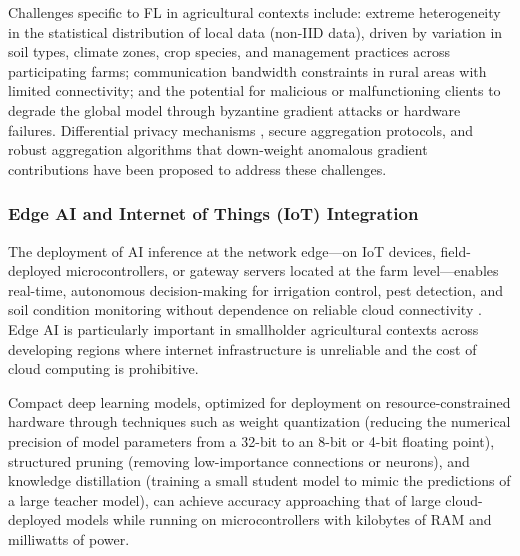 \documentclass[land,review,accept,pdftex,oneauthor]{Definitions/mdpi}
\begin{document}
Challenges specific to FL in agricultural contexts include: extreme heterogeneity in the statistical distribution of local data (non-IID data), driven by variation in soil types, climate zones, crop species, and management practices across participating farms; communication bandwidth constraints in rural areas with limited connectivity; and the potential for malicious or malfunctioning clients to degrade the global model through byzantine gradient attacks or hardware failures. Differential privacy mechanisms \citep{dwork2014algorithmic}, secure aggregation protocols, and robust aggregation algorithms that down-weight anomalous gradient contributions have been proposed to address these challenges.

\subsubsection{Edge AI and Internet of Things (IoT) Integration}

The deployment of AI inference at the network edge---on IoT devices, field-deployed microcontrollers, or gateway servers located at the farm level---enables real-time, autonomous decision-making for irrigation control, pest detection, and soil condition monitoring without dependence on reliable cloud connectivity \citep{vij2020iot}. Edge AI is particularly important in smallholder agricultural contexts across developing regions where internet infrastructure is unreliable and the cost of cloud computing is prohibitive. 




Compact deep learning models, optimized for deployment on resource-constrained hardware through techniques such as weight quantization (reducing the numerical precision of model parameters from a 32-bit to an 8-bit or 4-bit floating point), structured pruning (removing low-importance connections or neurons), and knowledge distillation (training a small student model to mimic the predictions of a large teacher model), can achieve accuracy approaching that of large cloud-deployed models while running on microcontrollers with kilobytes of RAM and milliwatts of power.
\end{document}
